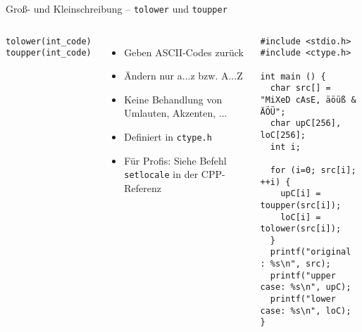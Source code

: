 \begin{frame}[fragile]{Groß- und Kleinschreibung -- \texttt{tolower} und \texttt{toupper}}
%
\vspace{-15pt}
\begin{columns}[T]
\begin{codebox}[Syntax]
\texttt{tolower(int\_code)}\newline
\texttt{toupper(int\_code)}
\end{codebox}
\begin{itemize}
\item Geben ASCII-Codes zurück
\item Ändern nur a...z bzw. A...Z
\item Keine Behandlung von Umlauten, Akzenten, ...
\item Definiert in \texttt{ctype.h}
\item Für Profis: Siehe Befehl \texttt{setlocale} in der CPP-Referenz
\end{itemize}
%
\begin{codebox}
\begin{verbatim}
#include <stdio.h>
#include <ctype.h>

int main () {
  char src[] = "MiXeD cAsE, äöüß & ÄÖÜ";
  char upC[256], loC[256];
  int i;

  for (i=0; src[i]; ++i) {
    upC[i] = toupper(src[i]);
    loC[i] = tolower(src[i]);
  }
  printf("original  : %s\n", src);
  printf("upper case: %s\n", upC);
  printf("lower case: %s\n", loC);
}
\end{verbatim}
\end{codebox}
\end{columns}
%
\end{frame}


